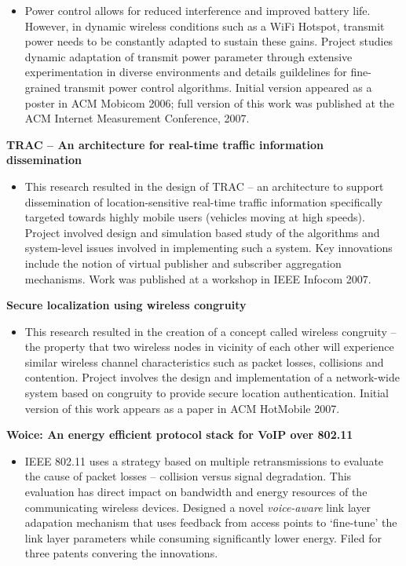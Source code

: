 \begin{resume}
\begin{itemize}
\item [] Power control allows for reduced interference and improved battery life.
However, in dynamic wireless conditions such as a WiFi Hotspot, transmit power
needs to be constantly adapted to sustain these gains. Project studies dynamic
adaptation of transmit power parameter through extensive experimentation in
diverse environments and details guildelines for fine-grained transmit power
control algorithms. Initial version appeared as a poster in ACM Mobicom 2006;
full version of this work was published at the ACM Internet Measurement
Conference, 2007.
\end{itemize} \vspace{-0.2cm}

{\bf TRAC -- An architecture for real-time traffic information dissemination}
    \begin{itemize}
	\item [] This research resulted in the design of TRAC -- an architecture to support dissemination of location-sensitive real-time traffic information
specifically targeted towards highly mobile users (vehicles moving at high speeds). Project involved design and
simulation based study of the algorithms and system-level issues involved in implementing such a system. Key innovations
include the notion of virtual publisher and subscriber aggregation mechanisms.
Work was published at a workshop in IEEE Infocom 2007.
    \end{itemize}

\vspace{-0.2cm}

{\bf Secure localization using wireless congruity}
    \begin{itemize}
	\item [] This research resulted in the creation of a concept called
	wireless congruity -- the property that two wireless nodes in vicinity of each other will
experience similar wireless channel characteristics such as packet losses, collisions and contention. Project involves the design
and implementation of a network-wide system based on congruity to provide secure location authentication. Initial
version of this work appears as a paper in ACM HotMobile 2007.
    \end{itemize}
\vspace{-0.2cm}

{\bf Woice: An energy efficient protocol stack for VoIP over 802.11}
    \begin{itemize}
	\item [] IEEE 802.11 uses a strategy based on multiple retransmissions  to evaluate the cause of packet losses
-- collision versus signal degradation. This evaluation has direct impact on
bandwidth and energy resources of the communicating wireless devices. Designed
a novel {\it voice-aware} link layer
adapation mechanism that uses feedback from access points to `fine-tune' the
link layer parameters while consuming significantly
lower energy.  Filed for three patents convering the innovations.
\end{itemize}
\vspace{-0.2cm}


\end{resume}
